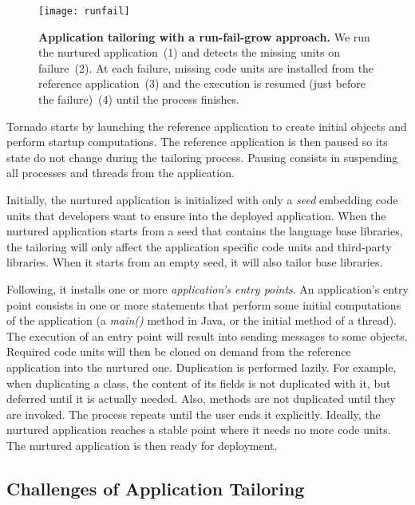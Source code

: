\begin{figure}[ht]
\begin{center}
\texttt{[image: runfail]}
\caption{\small \textbf{Application tailoring with a run-fail-grow approach.} We run the nurtured application~(1) and detects the missing units on failure~(2). At each failure, missing code units are installed from the reference application~(3) and the execution is resumed (just before the failure)~(4) until the process finishes. \label{fig:runfail}}
\end{center}
\end{figure}


Tornado starts by launching the reference application to create initial objects and perform startup computations. The reference application is then paused so its state do not change during the tailoring process. Pausing consists in suspending all processes and threads from the application.

Initially, the nurtured application is initialized with only a \emph{seed} embedding code units that developers want to ensure into the deployed application.
When the nurtured application starts from a seed that contains the language base libraries, the tailoring will only affect the application specific code units and third-party libraries.
When it starts from an empty seed, it will also tailor base libraries.

Following, it installs one or more \emph{application's entry points}.
An application's entry point consists in one or more statements that perform some initial computations of the application (\eg a \emph{main()} method in Java, or the initial method of a thread). 
The execution of an entry point will result into sending messages to some objects.
Required code units will then be cloned on demand from the reference application into the nurtured one.
Duplication is performed lazily.
For example, when duplicating a class, the content of its fields is not duplicated with it, but deferred until it is actually needed.
Also, methods are not duplicated until they are invoked.
The process repeats until the user ends it explicitly. Ideally, the nurtured application reaches a stable point where it needs no more code units.
The nurtured application is then ready for deployment.

\subsection{Challenges of Application Tailoring} \label{sec:challenges}

